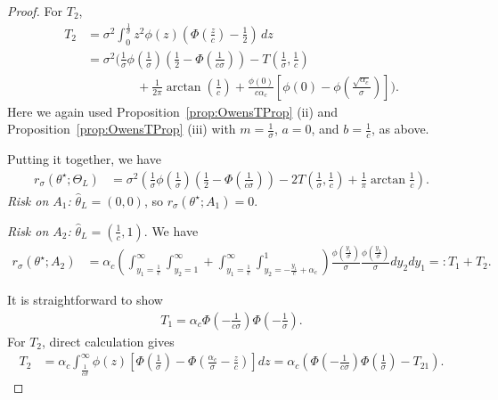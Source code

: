 \documentclass[11pt]{article}
\theoremstyle{plain}
\theoremstyle{definition}
\newcommand{\hattheta}{\hat{\theta}}
\newcommand{\inparen}[1]{\left(#1\right)}             %
\newcommand{\insquare}[1]{\left[#1\right]}             %
\begin{document}
\begin{proof}
    For $T_2$,
    \begin{align*}
    T_2
    &= \sigma^2 \int_0^{\frac{1}{\sigma}} z^2 \phi(z)
    \left(\Phi\left(\frac{z}{c}\right)-\frac{1}{2}\right)\,dz \\
    &= \sigma^2 \Bigg(
        \frac{1}{\sigma}\phi\left(\frac{1}{\sigma}\right)
        \left(\frac{1}{2}-\Phi\left(\frac{1}{c\sigma}\right)\right)
        - T\left(\frac{1}{\sigma},\frac{1}{c}\right) \\
    &\qquad\qquad
        + \frac{1}{2\pi} \arctan \left ( \frac{1}{c} \right)
        + \frac{\phi(0)}{c\alpha_c}
        \left[
            \phi(0)-\phi\left(\frac{\sqrt{\alpha_c}}{\sigma}\right)
        \right]
    \Bigg).
\end{align*}
Here we again used Proposition~\ref{prop:OwensTProp} (ii) and 
Proposition~\ref{prop:OwensTProp} (iii) with $m=\frac{1}{\sigma}$, $a=0$, and $b=\frac{1}{c}$, as above.
   
Putting it together, we have 
\begin{align*}
    r_\sigma(\theta^\star; \Theta_L)
    &=\sigma^2 \inparen{
    \frac{1}{\sigma} \phi \inparen{\frac{1}{\sigma}} \inparen{\frac{1}{2} - \Phi \inparen{\frac{1}{c\sigma}}}
    - 2T \inparen{\frac{1}{\sigma}, \frac{1}{c}} 
    + \frac{1}{\pi} \arctan \frac{1}{c}
    }.
\end{align*}
    \noindent
    \textit{Risk on $A_1$:} $\hattheta_L = (0,0)$, so $r_\sigma(\theta^\star; A_1) =0$.

    \noindent

\textit{Risk on $A_2$:} $\hattheta_L = (\frac1c,1)$. We have 
\begin{align*}
    r_\sigma(\theta^\star; A_2)
    &=
    \alpha_c 
    \inparen{ 
    \int_{y_1=\frac1c}^{\infty} \int_{y_2=1}^{\infty} 
    +
    \int_{y_1=\frac1c}^{\infty} \int_{y_2=-\frac{y_1}{c} + \alpha_c}^{1} 
    }
    \frac{\phi\inparen{\frac{y_1}{\sigma}}}{\sigma}
    \frac{\phi\inparen{\frac{y_2}{\sigma}}}{\sigma}
    dy_2 dy_1
    =: T_1 +T_2.
\end{align*}


It is straightforward to show
\begin{align*}
    T_1 = \alpha_c \Phi \inparen{-\frac{1}{c\sigma}}\Phi \inparen{-\frac{1}{\sigma}}.
\end{align*}
For $T_2$, direct calculation gives
\begin{align*}
    T_2 
    &= \alpha_c \int_{\frac{1}{c\sigma}}^\infty  \phi(z) \insquare{\Phi\inparen{\frac{1}{\sigma}}
    -\Phi\inparen{\frac{\alpha_c}{\sigma} - \frac{z}{c}}
    } dz
    =\alpha_c \inparen{
    \Phi \inparen{-\frac{1}{c\sigma}}\Phi \inparen{\frac{1}{\sigma}}
    - T_{21}
    }.
\end{align*}


\end{proof}
\end{document}
